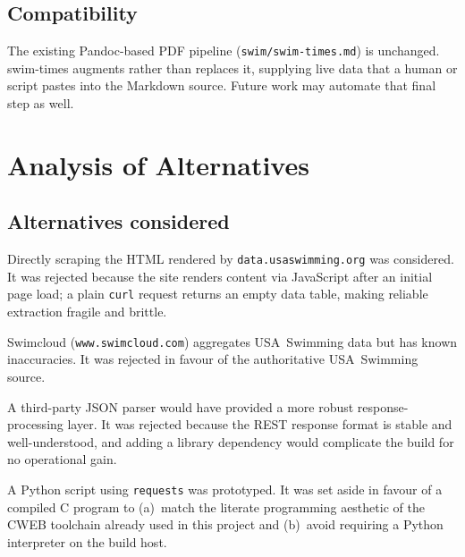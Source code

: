 \documentclass[12pt]{article}
\newcommand{\code}[1]{\texttt{#1}}
\begin{document}
\subsection{Compatibility}

The existing Pandoc-based PDF pipeline (\code{swim/swim-times.md})
is unchanged.  swim-times augments rather than replaces it,
supplying live data that a human or script pastes into the Markdown
source.  Future work may automate that final step as well.

\section{Analysis of Alternatives}

\subsection{Alternatives considered}

\begin{description}[style=nextline]
  \item[Web scraping via \code{curl}/HTML parsing.]
        Directly scraping the HTML rendered by
        \texttt{data.usaswimming.org} was considered.  It was
        rejected because the site renders content via JavaScript
        after an initial page load; a plain \code{curl} request
        returns an empty data table, making reliable extraction
        fragile and brittle.

  \item[Swimcloud API.]
        Swimcloud (\texttt{www.swimcloud.com}) aggregates
        USA~Swimming data but has known inaccuracies.  It was
        rejected in favour of the authoritative USA~Swimming source.

  \item[Full JSON parsing library (e.g., \code{cJSON}, \code{jansson}).]
        A third-party JSON parser would have provided a more robust
        response-processing layer.  It was rejected because the
        REST response format is stable and well-understood,
        and adding a library dependency would complicate the build
        for no operational gain.

  \item[Python or shell script.]
        A Python script using \code{requests} was prototyped.
        It was set aside in favour of a compiled C program to
        (a)~match the literate programming aesthetic of the
        CWEB toolchain already used in this project and
        (b)~avoid requiring a Python interpreter on the build host.
\end{description}
\end{document}
